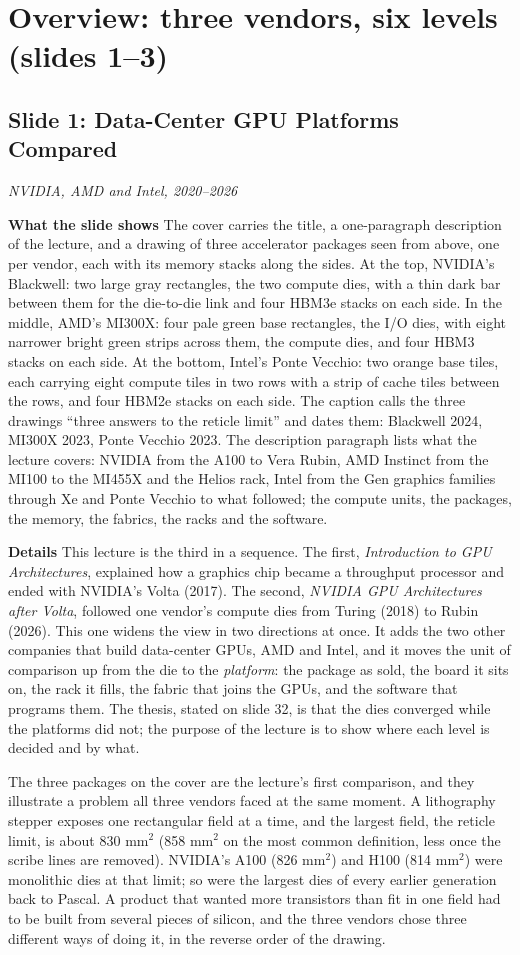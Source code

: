 \documentclass[11pt,letterpaper]{article}
\newcommand{\slide}[3]{%
  \subsection[Slide #1: #2]{Slide #1: #2}%
  {\color{muted}\itshape #3\par}\medskip}
\newcommand{\para}[1]{\medskip\noindent\textbf{#1}\quad}
\begin{document}
\section{Overview: three vendors, six levels (slides 1--3)}

\slide{1}{Data-Center GPU Platforms Compared}{NVIDIA, AMD and Intel, 2020--2026}

\para{What the slide shows} The cover carries the title, a one-paragraph description of the lecture, and a drawing of three accelerator packages seen from above, one per vendor, each with its memory stacks along the sides. At the top, NVIDIA's Blackwell: two large gray rectangles, the two compute dies, with a thin dark bar between them for the die-to-die link and four HBM3e stacks on each side. In the middle, AMD's MI300X: four pale green base rectangles, the I/O dies, with eight narrower bright green strips across them, the compute dies, and four HBM3 stacks on each side. At the bottom, Intel's Ponte Vecchio: two orange base tiles, each carrying eight compute tiles in two rows with a strip of cache tiles between the rows, and four HBM2e stacks on each side. The caption calls the three drawings ``three answers to the reticle limit'' and dates them: Blackwell 2024, MI300X 2023, Ponte Vecchio 2023. The description paragraph lists what the lecture covers: NVIDIA from the A100 to Vera Rubin, AMD Instinct from the MI100 to the MI455X and the Helios rack, Intel from the Gen graphics families through Xe and Ponte Vecchio to what followed; the compute units, the packages, the memory, the fabrics, the racks and the software.

\para{Details} This lecture is the third in a sequence. The first, \emph{Introduction to GPU Architectures}, explained how a graphics chip became a throughput processor and ended with NVIDIA's Volta (2017). The second, \emph{NVIDIA GPU Architectures after Volta}, followed one vendor's compute dies from Turing (2018) to Rubin (2026). This one widens the view in two directions at once. It adds the two other companies that build data-center GPUs, AMD and Intel, and it moves the unit of comparison up from the die to the \emph{platform}: the package as sold, the board it sits on, the rack it fills, the fabric that joins the GPUs, and the software that programs them. The thesis, stated on slide 32, is that the dies converged while the platforms did not; the purpose of the lecture is to show where each level is decided and by what.

The three packages on the cover are the lecture's first comparison, and they illustrate a problem all three vendors faced at the same moment. A lithography stepper exposes one rectangular field at a time, and the largest field, the reticle limit, is about 830 mm$^2$ (858 mm$^2$ on the most common definition, less once the scribe lines are removed). NVIDIA's A100 (826 mm$^2$) and H100 (814 mm$^2$) were monolithic dies at that limit; so were the largest dies of every earlier generation back to Pascal. A product that wanted more transistors than fit in one field had to be built from several pieces of silicon, and the three vendors chose three different ways of doing it, in the reverse order of the drawing.
\end{document}
